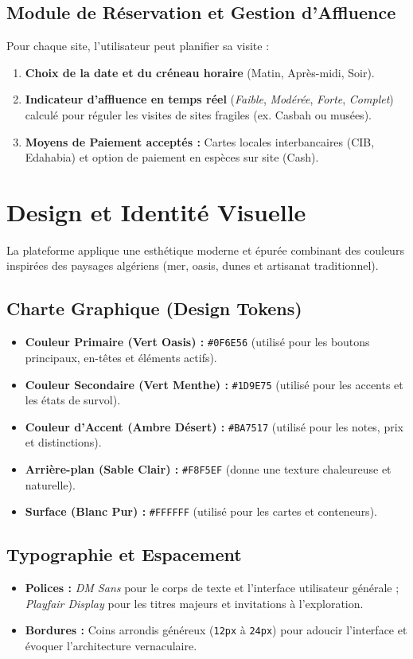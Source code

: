 \documentclass[11pt,a4paper]{article}
\begin{document}
\subsection{Module de Réservation et Gestion d'Affluence}
Pour chaque site, l'utilisateur peut planifier sa visite :
\begin{enumerate}
    \item \textbf{Choix de la date et du créneau horaire} (Matin, Après-midi, Soir).
    \item \textbf{Indicateur d'affluence en temps réel} (\textit{Faible}, \textit{Modérée}, \textit{Forte}, \textit{Complet}) calculé pour réguler les visites de sites fragiles (ex. Casbah ou musées).
    \item \textbf{Moyens de Paiement acceptés :} Cartes locales interbancaires (CIB, Edahabia) et option de paiement en espèces sur site (Cash).
\end{enumerate}

\section{Design et Identité Visuelle}
La plateforme applique une esthétique moderne et épurée combinant des couleurs inspirées des paysages algériens (mer, oasis, dunes et artisanat traditionnel).

\subsection{Charte Graphique (Design Tokens)}
\begin{itemize}
    \item \textbf{Couleur Primaire (Vert Oasis) :} \texttt{\#0F6E56} (utilisé pour les boutons principaux, en-têtes et éléments actifs).
    \item \textbf{Couleur Secondaire (Vert Menthe) :} \texttt{\#1D9E75} (utilisé pour les accents et les états de survol).
    \item \textbf{Couleur d'Accent (Ambre Désert) :} \texttt{\#BA7517} (utilisé pour les notes, prix et distinctions).
    \item \textbf{Arrière-plan (Sable Clair) :} \texttt{\#F8F5EF} (donne une texture chaleureuse et naturelle).
    \item \textbf{Surface (Blanc Pur) :} \texttt{\#FFFFFF} (utilisé pour les cartes et conteneurs).
\end{itemize}

\subsection{Typographie et Espacement}
\begin{itemize}
    \item \textbf{Polices :} \textit{DM Sans} pour le corps de texte et l'interface utilisateur générale ; \textit{Playfair Display} pour les titres majeurs et invitations à l'exploration.
    \item \textbf{Bordures :} Coins arrondis généreux (\texttt{12px} à \texttt{24px}) pour adoucir l'interface et évoquer l'architecture vernaculaire.
\end{itemize}
\end{document}
